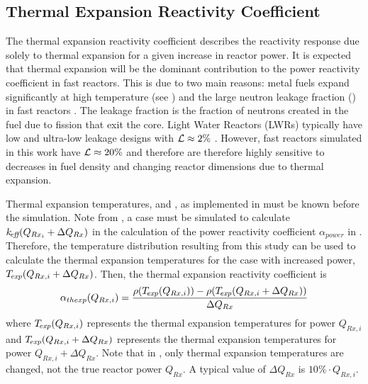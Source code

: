   \subsection{Thermal Expansion Reactivity Coefficient}
  \label{sec:thermal_expansion_reactivity_coefficent}
    The thermal expansion reactivity coefficient describes the reactivity 
    response due solely to thermal expansion for a given increase in reactor 
    power. It is expected that thermal expansion will be the dominant 
    contribution to the power reactivity coefficient in fast reactors. This is 
    due to two main reasons: metal fuels expand significantly at high 
    temperature (see ) and the large neutron leakage 
    fraction (\leakage) in fast reactors \cite{PlentifulEnergy}. The leakage 
    fraction is the fraction of neutrons created in the fuel due to fission that 
    exit the core. Light Water Reactors (LWRs) typically have low and ultra-low 
    leakage designs with $\mathcal{L} \approx 2 \%$ \cite{textbookknief}. However,
    fast reactors simulated in this work have $\mathcal{L} \approx 20\%$ and 
    therefore are therefore highly sensitive to decreases in fuel density and 
    changing reactor dimensions due to thermal expansion.

    Thermal expansion temperatures, \texpfuel and \texpstruct, as implemented in 
     must be known before the simulation. Note from
    , a case must be simulated to
    calculate $k_{\!\mbox{\scriptsize \em eff}}(Q_{Rx_i} + \Delta Q_{Rx})$ in the calculation of the power
    reactivity coefficient $\alpha_{power}$ in 
    .  Therefore, the temperature
    distribution resulting from this study can be used to calculate the thermal
    expansion temperatures for the case with increased power, 
    ${{T_{\!\mbox{\scriptsize \em exp}}}(Q_{Rx,i} + \Delta Q_{Rx})}$.
    Then, the thermal expansion reactivity coefficient is 
    \begin{equation}
      \label{eq:thermal_expansion_reactivity_coefficient}
      \alpha_{thexp}(Q_{Rx,i}) = \frac{\rho({T_{\!\mbox{\scriptsize \em exp}}}(Q_{Rx,i})) - 
        \rho({T_{\!\mbox{\scriptsize \em exp}}}(Q_{Rx,i} + \Delta Q_{Rx}))}
        {\Delta Q_{Rx}}
    \end{equation}
    where ${T_{\!\mbox{\scriptsize \em exp}}}(Q_{Rx,i})$ represents the thermal expansion temperatures for
    power $Q_{Rx,i}$ and ${T_{\!\mbox{\scriptsize \em exp}}}(Q_{Rx,i} + \Delta Q_{Rx})$ represents the
    thermal expansion temperatures for power $Q_{Rx,i} + \Delta Q_{Rx}$. Note
    that in , only thermal
    expansion temperatures are changed, not the true reactor power $Q_{Rx}$.
    A typical value of $\Delta Q_{Rx}$ is $10\% \cdot Q_{Rx,i}$.

